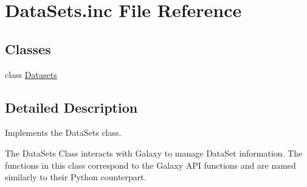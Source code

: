 \hypertarget{DataSets_8inc}{}\section{Data\+Sets.\+inc File Reference}
\label{DataSets_8inc}
\subsection*{Classes}
\begin{DoxyCompactItemize}
\item 
class \hyperlink{classDatasets}{Datasets}
\end{DoxyCompactItemize}


\subsection{Detailed Description}
Implements the Data\+Sets class.

The Data\+Sets Class interacts with Galaxy to manage Data\+Set information. The functions in this class correspond to the Galaxy A\+PI functions and are named similarly to their Python counterpart. 